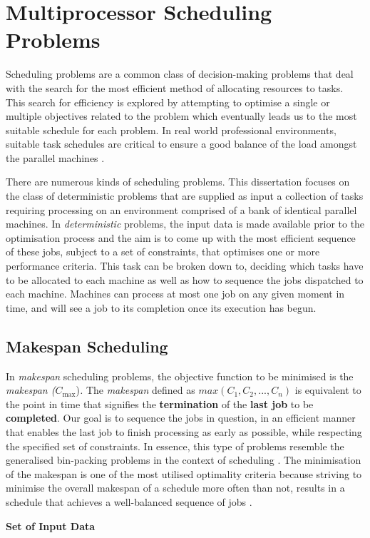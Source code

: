\section{Multiprocessor Scheduling Problems}

Scheduling problems are a common class of decision-making problems that deal with the search for the most efficient method of allocating resources to tasks. This search for efficiency is explored by attempting to optimise a single or multiple objectives related to the problem which eventually leads us to the most suitable schedule for each problem. In real world professional environments, suitable task schedules are critical to ensure a good balance of the load amongst the parallel machines \cite{DUMMY:2}.\par
\vspace{\baselineskip}
\noindent
There are numerous kinds of scheduling problems. This dissertation focuses on the class of deterministic problems that are supplied as input a collection of tasks requiring processing on an environment comprised of a bank of identical parallel machines. In \textit{deterministic} problems, the input data is made available prior to the optimisation process and the aim is to come up with the most efficient sequence of these jobs, subject to a set of constraints, that optimises one or more performance criteria. This task can be broken down to, deciding which tasks have to be allocated to each machine as well as how to sequence the jobs dispatched to each machine. Machines can process at most one job on any given moment in time, and will see a job to its completion once its execution has begun. \par


\subsection*{Makespan Scheduling}
\label{section:Makespan Scheduling}
In \textit{makespan} scheduling problems, the objective function to be minimised is the \textit{makespan (\( C_{\max }\)})\textit{. }The \textit{makespan }defined as  \( max \left( C_{1},C_{2},...,C_{n} \right)   \) is equivalent to the point in time that signifies the \textbf{termination} of the\textbf{ last job} to be \textbf{completed}. Our goal is to sequence the jobs in question, in an efficient manner that enables the last job to finish processing as early as possible, while respecting the specified set of constraints. In essence, this type of problems resemble the generalised bin-packing problems in the context of scheduling \cite{Coffman1978AnAO}. The minimisation of the makespan is one of the most utilised optimality criteria \cite{schedalgos} because striving to minimise the overall makespan of a schedule more often than not, results in a schedule that achieves a well-balanced sequence of jobs \cite{DUMMY:2}. \par
\vspace{\baselineskip}
\noindent
\textbf{Set of Input Data}

